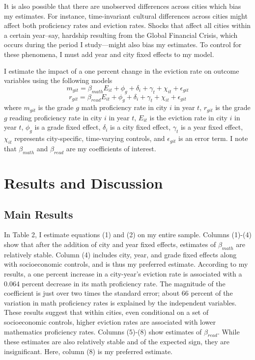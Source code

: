 \documentclass[12pt]{article}
\begin{document}
It is also possible that there are unobserved differences across cities which bias my estimates. For instance, time-invariant cultural differences across cities might affect both proficiency rates and eviction rates. Shocks that affect all cities within a certain year–say, hardship resulting from the Global Financial Crisis, which occurs during the period I study—might also bias my estimates. To control for these phenomena, I must add year and city fixed effects to my model.

I estimate the impact of a one percent change in the eviction rate on outcome variables using the following models
\begin{equation}
m_{git} = \beta_{math} E_{it} + \phi_g + \delta_i + \gamma_t +  \chi_{it} + \epsilon_{git}
\end{equation}
\begin{equation}
r_{git} = \beta_{read} E_{it} + \phi_g + \delta_i + \gamma_t + \chi_{it} + \epsilon_{git}
\end{equation}
where $m_{git}$ is the grade $g$ math proficiency rate in city $i$ in year $t$, $r_{git}$ is the grade $g$ reading proficiency rate in city $i$ in year $t$, $E_{it}$ is the eviction rate in  city $i$ in year $t$, $\phi_g$ is a grade fixed effect, $\delta_i$ is a city fixed effect, $\gamma_t$ is a year fixed effect,  $\chi_{it}$ represents city-specific, time-varying controls, and $\epsilon_{git}$ is an error term. I note that $\beta_{math}$ and $\beta_{read}$ are my coefficients of interest.


\section{Results and Discussion} \label{sec:result}
\subsection{Main Results}
In Table 2, I estimate equations (1) and (2) on my entire sample. Columns (1)-(4) show that after the addition of city and year fixed effects, estimates of $\beta_{math}$ are relatively stable. Column (4) includes city, year, and grade fixed effects along with socioeconomic controls, and is thus my preferred estimate. According to my results, a one percent increase in a city-year's eviction rate is associated with a 0.064 percent decrease in its math proficiency rate. The magnitude of the coefficient is just over two times the standard error; about 66 percent of the variation in math proficiency rates is explained by the independent variables. These results suggest that within cities, even conditional on a set of socioeconomic controls, higher eviction rates are associated with lower mathematics proficiency rates. Columns (5)-(8) show estimates of $\beta_{read}$. While these estimates are also relatively stable and of the expected sign, they are insignificant. Here, column (8) is my preferred estimate.
    
\end{document}
